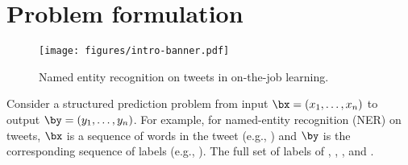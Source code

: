 \section{Problem formulation}
\label{sec:model}

\begin{figure}[t]
  \begin{centering}
  \texttt{[image: figures/intro-banner.pdf]}
  \end{centering}
  \caption{
    Named entity recognition on tweets in on-the-job learning.
}
\label{fig:crf}
\end{figure}


Consider a structured prediction problem from input $\bx = (x_1, \dots, x_n)$ to output $\by = (y_1, \dots, y_n)$.
For example, for named-entity recognition (NER) on tweets,
$\bx$ is a sequence of words in the tweet (e.g., )
and $\by$ is the corresponding sequence of labels (e.g., \scnone{} \scloc{} \scloc{}).
The full set of labels of \scper{}, \scloc{}, \scres{}, and \scnone{}.

